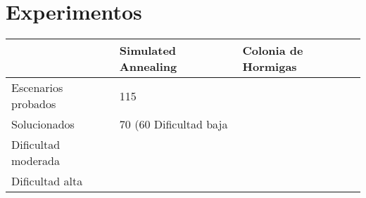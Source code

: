 \section{Experimentos}

\begin{table}
\centering
\begin{tabular}{|l|l|l|}
\hline
          & \textbf{Simulated Annealing} & \textbf{Colonia de Hormigas} \\ \hline
{Escenarios probados} &       115                       &                              \\ \hline
{Solucionados} &                      70 (60%
{Dificultad baja} &                              &                              \\ \hline
{Dificultad moderada} &                              &                              \\ \hline
{Dificultad alta} &                              &                              \\ \hline
\end{tabular}
\end{table}
